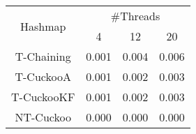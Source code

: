 \begin{tabular}{|c|c|c|c|}
\hline
\multirow{2}{*}{Hashmap} & \multicolumn{3}{c|}{\#Threads}\\\cline{2-4}& 4 & 12 & 20\\
\hline
\hline
T-Chaining & 0.001 & 0.004 & 0.006\\
T-CuckooA & 0.001 & 0.002 & 0.003\\
T-CuckooKF & 0.001 & 0.002 & 0.003\\
NT-Cuckoo & 0.000 & 0.000 & 0.000\\
\hline
\end{tabular}
